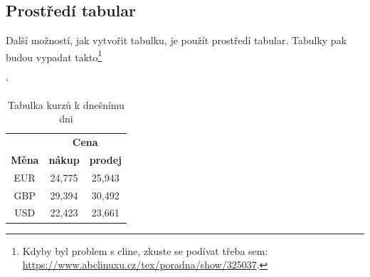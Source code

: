\documentclass[a4paper,11pt,final]{article}
\begin{document}
	\subsection{Prostředí {\ttfamily tabular}} 	
	
	Další možností, jak vytvořit tabulku, je použít prostředí {\ttfamily tabular}. Tabulky pak budou vypadat takto\footnote{Kdyby byl problem s {\ttfamily cline}, zkuste se podívat třeba sem: \url{https://www.abclinuxu.cz/tex/poradna/show/325037}.}
	
	\catcode`
	\begin{table}[h]
		\centering
		\begin{tabular}{|c|c|c|}
			\hline
			& \multicolumn{2}{c|}{\textbf{Cena}} \\
			\cline{2-3}
			\textbf{Měna} & \textbf{nákup} & \textbf{prodej}\\
			\hline
			EUR & 24,775 & 25,943\\
			GBP & 29,394 & 30,492\\
			USD & 22,423 & 23,661\\
			\hline
	
		\end{tabular} 
		\caption{Tabulka kurzů k dnešnímu dni}
		\label{meny}
	\end{table}
\end{document}
